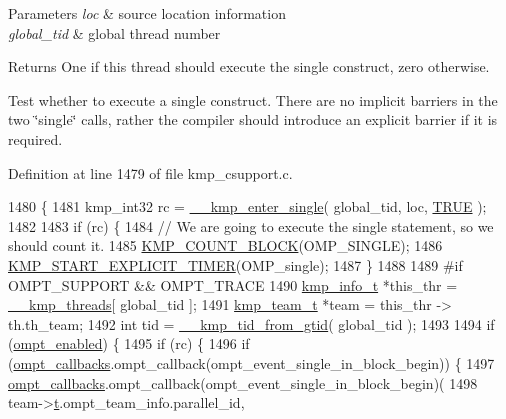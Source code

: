 \begin{DoxyParams}{Parameters}
{\em loc} & source location information \\
\hline
{\em global\-\_\-tid} & global thread number \\
\hline
\end{DoxyParams}
\begin{DoxyReturn}{Returns}
One if this thread should execute the single construct, zero otherwise.
\end{DoxyReturn}
Test whether to execute a {\ttfamily single} construct. There are no implicit barriers in the two \char`\"{}single\char`\"{} calls, rather the compiler should introduce an explicit barrier if it is required. 

Definition at line 1479 of file kmp\-\_\-csupport.\-c.


\begin{DoxyCode}
1480 \{
1481     kmp\_int32 rc = \hyperlink{kmp_8h_a7c462a6cf8fc9d4a238c3b21234754ea}{\_\_kmp\_enter\_single}( global\_tid, loc, \hyperlink{kmp_8h_aa8cecfc5c5c054d2875c03e77b7be15d}{TRUE} );
1482 
1483     \textcolor{keywordflow}{if} (rc) \{
1484         \textcolor{comment}{// We are going to execute the single statement, so we should count it.}
1485         \hyperlink{group__STATS__GATHERING_ga7fa64ec62947bf0b97f3f4778dd22196}{KMP\_COUNT\_BLOCK}(OMP\_SINGLE);
1486         \hyperlink{group__STATS__GATHERING_ga8b26485fe6ad4f74b63e54c42fcfd875}{KMP\_START\_EXPLICIT\_TIMER}(OMP\_single);
1487     \}
1488 
1489 \textcolor{preprocessor}{#if OMPT\_SUPPORT && OMPT\_TRACE}
1490 \textcolor{preprocessor}{}    \hyperlink{kmp_8h_a194859801fe16b326efe34501a37c30a}{kmp\_info\_t} *this\_thr        = \hyperlink{kmp_8h_a8ba907eb5a2568ff55a49a1504cd3624}{\_\_kmp\_threads}[ global\_tid ];
1491     \hyperlink{unionkmp__team}{kmp\_team\_t} *team            = this\_thr -> th.th\_team;
1492     \textcolor{keywordtype}{int} tid = \hyperlink{kmp_8h_afb8f84fff9682417eb1c484ffbfdc6ee}{\_\_kmp\_tid\_from\_gtid}( global\_tid );
1493 
1494     \textcolor{keywordflow}{if} (\hyperlink{ompt-general_8c_a966b31b6d05f79f5495f8d8e71732f68}{ompt\_enabled}) \{
1495         \textcolor{keywordflow}{if} (rc) \{
1496             \textcolor{keywordflow}{if} (\hyperlink{ompt-general_8c_a84a29d89cef82c7c38e1ee1f70ec994f}{ompt\_callbacks}.ompt\_callback(ompt\_event\_single\_in\_block\_begin)) \{
1497                 \hyperlink{ompt-general_8c_a84a29d89cef82c7c38e1ee1f70ec994f}{ompt\_callbacks}.ompt\_callback(ompt\_event\_single\_in\_block\_begin)(
1498                     team->\hyperlink{unionkmp__team_a87cf4571108a61b446e809094f8c0362}{t}.ompt\_team\_info.parallel\_id,

\end{DoxyCode}

